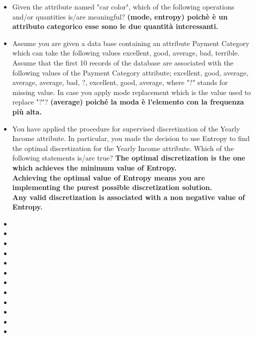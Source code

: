 \documentclass[12pt, a4paper,titlepage,openany]{article}
\begin{document}
\begin{itemize}
	\item Given the attribute named "car color", which of the following operations and/or quantities is/are meaningful? \textbf{(mode, entropy)  poichè è un attributo categorico esse sono le due quantità interessanti.}
	\item Assume you are given a data base containing an attribute Payment Category which can take the following values {excellent, good, average, bad, terrible}. Assume that the first 10 records of the database are associated with the following values of the Payment Category attribute; {excellent, good, average, average, average, bad, ?, excellent, good, average}, where "?" stands for missing value. In case you apply mode replacement which is the value used to replace "?"? \textbf{(average) poiché la moda è l'elemento con la frequenza più alta.}
	\item You have applied the procedure for supervised discretization of the Yearly Income attribute. In particular, you made the decision to use Entropy to find the optimal discretization for the Yearly Income attribute. Which of the following statements is/are true? \textbf{The optimal discretization is the one which achieves the minimum value of Entropy.\\ Achieving the optimal value of Entropy means you are implementing the purest possible discretization solution.\\ Any valid discretization is associated with a non negative value of Entropy.
	}
	\item
	\item
	\item
	\item
	\item
	\item
	\item
	\item
	\item
	\item
	\item
	\item
\end{itemize}
\end{document}
